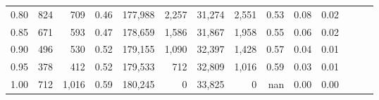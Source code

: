\begin{tabular}{rrrrrrrrrrrrrr}
0.80 &     824 &    709 &  0.46 &  177,988 &    2,257 &  31,274 &   2,551 &  0.53 &  0.08 &      0.02 \\
0.85 &     671 &    593 &  0.47 &  178,659 &    1,586 &  31,867 &   1,958 &  0.55 &  0.06 &      0.02 \\
0.90 &     496 &    530 &  0.52 &  179,155 &    1,090 &  32,397 &   1,428 &  0.57 &  0.04 &      0.01 \\
0.95 &     378 &    412 &  0.52 &  179,533 &      712 &  32,809 &   1,016 &  0.59 &  0.03 &      0.01 \\
1.00 &     712 &  1,016 &  0.59 &  180,245 &        0 &  33,825 &       0 &   nan &  0.00 &      0.00 \\
\bottomrule
\end{tabular}
